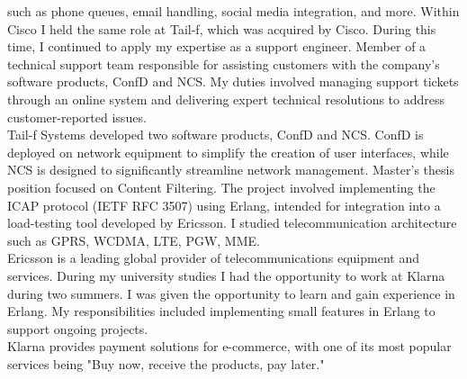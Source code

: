 \documentclass[purpleprocv]{procv}
\begin{document}
\begin{procv-twocolumns}
{{          such as phone queues, email handling, social media integration, and more.}
          {Within Cisco I held the same role at Tail-f, which was acquired by Cisco. During this time, 
          I continued to apply my expertise as a support engineer.}
          {Member of a technical support team responsible for assisting customers with the company’s software 
          products, ConfD and NCS. My duties involved managing support tickets through an online system and delivering expert 
          technical resolutions to address customer-reported issues.
          \\[3pt]
          Tail-f Systems developed two software products, ConfD and NCS. ConfD is deployed on network equipment to simplify 
          the creation of user interfaces, while NCS is designed to significantly streamline network management.}
          {Master’s thesis position focused on Content Filtering. The project involved implementing the ICAP 
          protocol (IETF RFC 3507) using Erlang, intended for integration into a load-testing tool developed by Ericsson.
          I studied telecommunication architecture such as GPRS, WCDMA, LTE, PGW, MME.
          \\[3pt]
          Ericsson is a leading global provider of telecommunications equipment and services.}
          {During my university studies I had the opportunity to work at Klarna during two summers. I was given the opportunity to learn and 
          gain experience in Erlang. My responsibilities included implementing small features in Erlang to support ongoing projects.
          \\[3pt]
          Klarna provides payment solutions for e-commerce, with one of its most popular services being 
          "Buy now, receive the products, pay later."}
        }
\end{procv-twocolumns}
\end{document}
